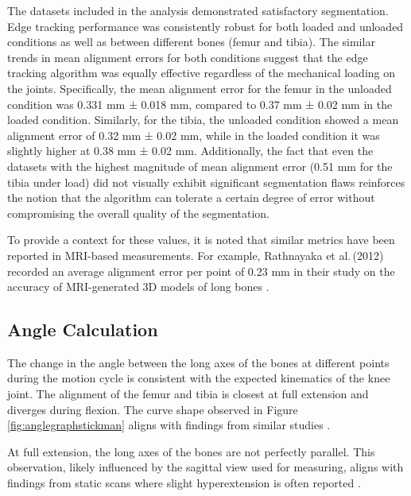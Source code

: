 \documentclass{micro-econ-thesis}
\begin{document}
The datasets included in the analysis  demonstrated satisfactory segmentation. Edge tracking performance was consistently robust for both loaded and unloaded conditions as well as between different bones (femur and tibia). The similar trends in mean alignment errors for both conditions suggest that the edge tracking algorithm was equally effective regardless of the mechanical loading on the joints. Specifically, the mean alignment error for the femur in the unloaded condition was 0.331 mm ± 0.018 mm, compared to 0.37 mm ± 0.02 mm in the loaded condition. Similarly, for the tibia, the unloaded condition showed a mean alignment error of 0.32 mm ± 0.02 mm, while in the loaded condition it was slightly higher at 0.38 mm ± 0.02 mm. Additionally, the fact that even the datasets with the highest magnitude of mean alignment error (0.51 mm for the tibia under load) did not visually exhibit significant segmentation flaws reinforces the notion that the algorithm can tolerate a certain degree of error without compromising the overall quality of the segmentation.

To provide a context for these values, it is noted that similar metrics have been reported in MRI-based measurements. For example, Rathnayaka et al.\,(2012) recorded an average alignment error per point of 0.23 mm in their study on the accuracy of MRI-generated 3D models of long bones \parencite{rathnayaka_quantification_2012}. 


\subsection{Angle Calculation}

The change in the angle between the long axes of the bones at different points during the motion cycle is consistent with the expected kinematics of the knee joint. The alignment of the femur and tibia is closest at full extension and diverges during flexion. The curve shape observed in Figure \ref{fig:anglegraphstickman} aligns with findings from similar studies \parencite{jeon_detection_2019}.

At full extension, the long axes of the bones are not perfectly parallel. This observation, likely influenced by the sagittal view used for measuring, aligns with findings from static scans where slight hyperextension is often reported \parencite{dai_comparing_2021}. 
\end{document}
